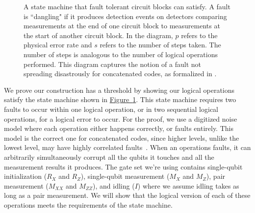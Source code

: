 \documentclass[onecolumn,unpublished,a4paper]{quantumarticle}
\theoremstyle{definition}
\theoremstyle{definition}
\theoremstyle{definition}
\newcommand{\fig}[1]{\hyperref[fig:#1]{Figure~\ref*{fig:#1}}}
\begin{document}
\begin{figure}[H]
    \centering
    \caption{
        A state machine that fault tolerant circuit blocks can satisfy.
        A fault is ``dangling" if it produces detection events on detectors comparing measurements at the end of one circuit block to measurements at the start of another circuit block.
        In the diagram, $p$ refers to the physical error rate and $s$ refers to the number of steps taken.
        The number of steps is analogous to the number of logical operations performed.  This diagram captures the notion of a fault not spreading disastrously for concatenated codes, as formalized in \cite{aliferis2006threshold, aliferis2011thesis}.
    }
    \label{fig:threshold_machine}
\end{figure}

We prove our construction has a threshold by showing our logical operations satisfy the state machine shown in \fig{threshold_machine}.
This state machine requires two faults to occur within one logical operation, or in two sequential logical operations, for a logical error to occur.
For the proof, we use a digitized noise model where each operation either happens correctly, or faults entirely. This model is the correct one for concatenated codes, since higher levels, unlike the lowest level, may have highly correlated faults~\cite{aliferis2006threshold}.
When an operations faults, it can arbitrarily simultaneously corrupt all the qubits it touches and all the measurement results it produces.
The gate set we're using contains single-qubit initialization ($R_X$ and $R_Z$), single-qubit measurement ($M_X$ and $M_Z$), pair measurement ($M_{XX}$ and $M_{ZZ}$), and idling ($I$) where we assume idling takes as long as a pair measurement.
We will show that the logical version of each of these operations meets the requirements of the state machine.
\end{document}
